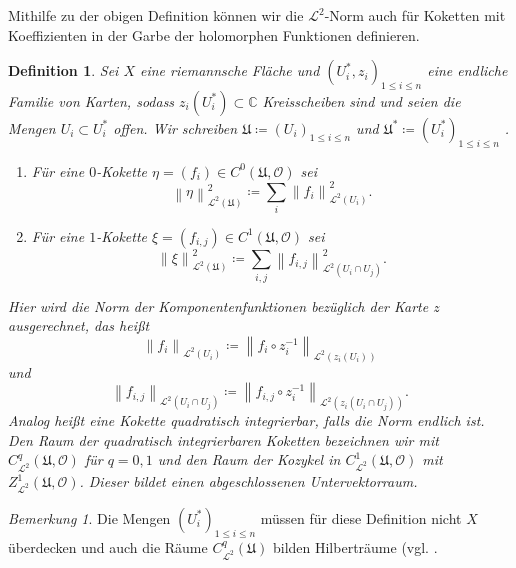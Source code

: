 \documentclass[11pt,a4paper,toc=bibliography]{scrartcl}
\theoremstyle{def}
\newtheorem{defi}{Definition}[section]
\theoremstyle{thm}
\theoremstyle{remark}
\newtheorem*{bem}{Bemerkung}
\newcommand*{\norm}[1]{\left\lVert#1\right\rVert} %
\begin{document}

Mithilfe zu der obigen Definition können wir die $\mathcal{L}^2$-Norm auch für Koketten mit Koeffizienten in der Garbe der holomorphen Funktionen definieren.
\begin{defi}
Sei $X$ eine riemannsche Fläche und $\left( U_i^{*},z_i\right)_{1\leq i\leq n}$ eine endliche Familie von Karten, sodass $z_i(U_i^{*})\subset \mathbb{C}$ Kreisscheiben sind und seien die Mengen $U_i\subset U_i^{*}$ offen. Wir schreiben $\mathfrak{U}\coloneqq\left( U_i \right)_{1\leq i\leq n}$ und $\mathfrak{U}^{*}\coloneqq\left( U_i^{*}\right)_{1\leq i\leq n}$ .
\begin{enumerate}
\item
Für eine $0$-Kokette $\eta = (f_i)\in C^0(\mathfrak{U},\mathcal{O})$ sei
$$
\norm{\eta}_{\mathcal{L}^2(\mathfrak{U})}^2 \coloneqq \sum_i \norm{f_i}_{\mathcal{L}^2(U_i)}^2.
$$
\item
Für eine $1$-Kokette $\xi= (f_{i,j})\in C^1(\mathfrak{U,\mathcal{O}}) $ sei 
$$
\norm{\xi}_{\mathcal{L}^2 (\mathfrak{U})}^2\coloneqq \sum_{i,j} \norm{f_{i,j}}_{\mathcal{L}^2(U_i\cap U_j)}^2.
$$
\end{enumerate} 
Hier wird die Norm der Komponentenfunktionen bezüglich der Karte $z$ ausgerechnet, das heißt
$$
\norm{f_i}_{\mathcal{L}^2(U_i)} \coloneqq \norm{f_i\circ z_i^{-1}}_{\mathcal{L}^2(z_i(U_i))}
$$ 
und 
$$
\norm{f_{i,j}}_{\mathcal{L}^2(U_i\cap U_j)}\coloneqq \norm{f_{i,j}\circ z_i^{-1}}_{\mathcal{L}^2(z_i(U_i\cap U_j))}.
$$
Analog heißt eine Kokette \emph{quadratisch integrierbar}, falls die Norm endlich ist. \\Den Raum der quadratisch integrierbaren Koketten bezeichnen wir mit $C^q_{\mathcal{L}^2}(\mathfrak{U},\mathcal{O})$ für $q=0,1$ und den Raum der Kozykel in $C^1_{\mathcal{L}^2}(\mathfrak{U},\mathcal{O})$ mit $Z^1_{\mathcal{L}^2}(\mathfrak{U},\mathcal{O})$. Dieser bildet einen abgeschlossenen Untervektorraum.
\end{defi}
\begin{bem}
Die Mengen $(U^*_i)_{1\leq i\leq n }$ müssen für diese Definition nicht $X$ überdecken und auch die Räume $C^q_{\mathcal{L}^2}(\mathfrak{U})$ bilden Hilberträume (vgl. \cite[~S.112]{forster}.
\end{bem}
\end{document}
